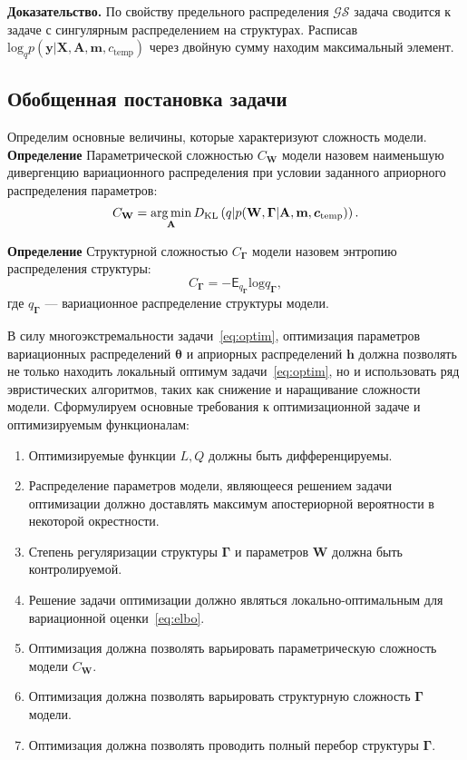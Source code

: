 \textbf{Доказательство.}
По свойству предельного распределения $\mathcal{GS}$ задача сводится к задаче с сингулярным распределением на структурах.
Расписав $\text{log}_q {p}(\mathbf{y}|\mathbf{X},\mathbf{A},\mathbf{m}, c_{\text{temp}})$ через двойную сумму находим максимальный элемент.


\subsection{Обобщенная постановка задачи}
Определим основные величины, которые характеризуют сложность модели. \\

\textbf{Определение} Параметрической сложностью $C_{\mathbf{W}}$ модели назовем наименьшую дивергенцию вариационного распределения при условии заданного априорного распределения параметров:
\[
    C_{\mathbf{W}} = \operatorname*{arg\,min}_\mathbf{A} D_\text{KL}\left(q|p(\mathbf{W}, \boldsymbol{\Gamma}|\mathbf{A}, \mathbf{m}, {\boldsymbol{c}_\text{temp}})\right).
\]

\textbf{Определение} Структурной сложностью $C_{\boldsymbol{\Gamma}}$ модели назовем энтропию распределения структуры:
\[
    C_{\boldsymbol{\Gamma}} = -\mathsf{E}_{q_{\boldsymbol{\Gamma}}} \text{log}q_{\boldsymbol{\Gamma}},
\]
где $q_{\boldsymbol{\Gamma}}$ --- вариационное распределение структуры модели.

В силу многоэкстремальности задачи~\eqref{eq:optim}, оптимизация параметров вариационных распределений $\boldsymbol{\theta}$ и априорных распределений $\mathbf{h}$ должна позволять не только находить локальный оптимум задачи~\eqref{eq:optim}, но и использовать ряд эвристических алгоритмов, таких как снижение и наращивание сложности модели. 
Сформулируем основные требования к оптимизационной задаче и оптимизируемым функционалам:
\begin{enumerate}
\item Оптимизируемые функции $L,Q$ должны быть дифференцируемы.
\item Распределение параметров модели, являющееся решением задачи оптимизации должно доставлять максимум апостериорной вероятности в некоторой окрестности.
\item Степень регуляризации структуры $\boldsymbol{\Gamma}$ и параметров $\mathbf{W}$ должна быть контролируемой.
\item Решение задачи оптимизации должно являться локально-оптимальным для вариационной оценки~\eqref{eq:elbo}.
\item Оптимизация должна позволять варьировать параметрическую сложность модели $C_{\mathbf{W}}$.
\item Оптимизация должна позволять варьировать структурную сложность ${\boldsymbol{\Gamma}}$ модели.
\item Оптимизация должна позволять проводить полный перебор структуры $\boldsymbol{\Gamma}$.
\end{enumerate}


